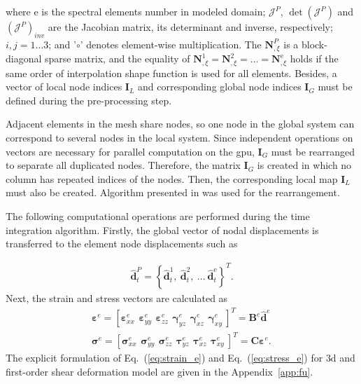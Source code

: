 \documentclass[a4paper,fleqn]{cas-dc}
\begin{document}
where e is the spectral elements number in modeled domain; \(\mathcal{J}^P\), \(\det\left(\mathcal{J}^P\right)\) and \(\left(\mathcal{J}^P\right)_{inv}\) are the Jacobian matrix, its determinant and inverse, respectively; $i,j=1\ldots3$; and '$\circ$' denotes element-wise multiplication.
The $\textbf{N}^P_{,\xi}$ is a block-diagonal sparse matrix, and the equality of $\textbf{N}^1_{,\xi}=\textbf{N}^2_{,\xi}=\ldots=\textbf{N}^{\mathrm{e}}_{,\xi}$ holds if the same order of interpolation shape function is used for all elements.
Besides, a vector of local node indices \(\textbf{I}_L\) and corresponding global node indices \(\textbf{I}_G\) must be defined during the pre-processing step.

Adjacent elements in the mesh share nodes, so one node in the global system can correspond to several nodes in the local system.
Since independent operations on vectors are necessary for parallel computation on the \ac{gpu}, $\textbf{I}_G$ must be rearranged to separate all duplicated nodes.
Therefore, the matrix $\textbf{I}_G$ is created in which no column has repeated indices of the nodes.
Then, the corresponding local map $\textbf{I}_L$ must also be created.
Algorithm presented in \cite{kudela2016parallel} was used for the rearrangement.

The following computational operations are performed during the time integration algorithm. Firstly, the global vector of nodal displacements is transferred to the element node displacements such as

\begin{eqnarray}
	\widehat{\textbf{d}}_t^P = \left\{\widehat{\textbf{d}}_t^{1},\ \widehat{\textbf{d}}_t^{2},\ \ldots\ \widehat{\textbf{d}}_t^{\mathrm{e}}\right\}^T.
\end{eqnarray}
Next, the strain and stress vectors are calculated as
\begin{eqnarray}
	\label{eq:strain_e}
	\boldsymbol{\varepsilon}^e =  \left[\boldsymbol{\varepsilon}^e_{xx}\,\ \boldsymbol{\varepsilon}^e_{yy}\,\ \boldsymbol{\varepsilon}^e_{zz}\,\ \boldsymbol{\gamma}^e_{yz}\,\ \boldsymbol{\gamma}^e_{xz}\,\ \boldsymbol{\gamma}^e_{xy}\ \right]^T=\textbf{B}^e\widehat{\textbf{d}}^e\,\\
	\label{eq:stress_e}
	\boldsymbol{\sigma}^e = \left[\boldsymbol{\sigma}^e_{xx}\,\ \boldsymbol{\sigma}^e_{yy}\,\ \boldsymbol{\sigma}^e_{zz}\,\ \boldsymbol{\tau}^e_{yz}\,\ \boldsymbol{\tau}^e_{xz}\,\ \boldsymbol{\tau}^e_{xy}\ \right]^T=\textbf{C}\boldsymbol{\varepsilon}^e.
\end{eqnarray}
The explicit formulation of Eq.~(\ref{eq:strain_e}) and Eq.~(\ref{eq:stress_e}) for \ac{3d} and first-order shear deformation model are given in the Appendix~\ref{app:fu}.
\end{document}

